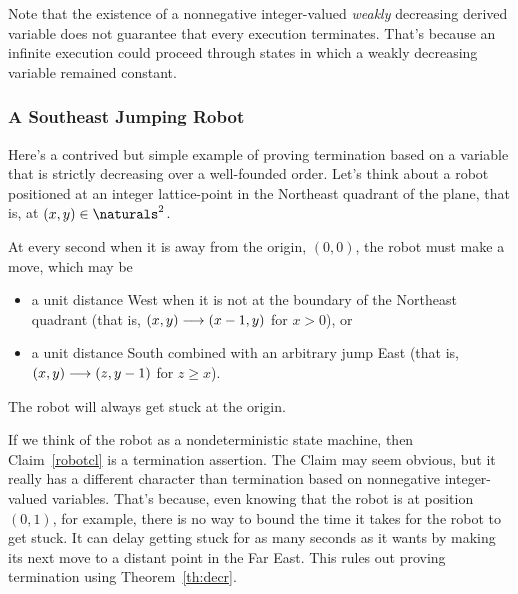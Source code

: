Note that the existence of a nonnegative integer-valued \emph{weakly}
decreasing derived variable does not guarantee that every execution
terminates.  That's because an infinite execution could proceed through
states in which a weakly decreasing variable remained constant.

\subsubsection{A Southeast Jumping Robot}

Here's a contrived but simple example of proving termination based on a
variable that is strictly decreasing over a well-founded order.  Let's
think about a robot positioned at an integer lattice-point in the
Northeast quadrant of the plane, that is, at $(x,y) \in \naturals^2$.

At every second when it is away from the origin, $(0,0)$, the robot must
make a move, which may be
\begin{itemize}

\item a unit distance West when it is not at the boundary of the Northeast
  quadrant (that is, $(x,y) \mathrel{\longrightarrow} (x-1,y)$ for $x>0$), or

\item a unit distance South combined with an arbitrary jump East (that is,
     $(x,y) \mathrel{\longrightarrow} (z,y-1)$ for $z\geq x$).

\end{itemize}
\begin{claim}\label{robotcl}
The robot will always get stuck at the origin.
\end{claim}

If we think of the robot as a nondeterministic state machine, then
Claim~\ref{robotcl} is a termination assertion.  The Claim may seem
obvious, but it really has a different character than termination based on
nonnegative integer-valued variables.  That's because, even knowing that
the robot is at position $(0,1)$, for example, there is no way to bound
the time it takes for the robot to get stuck.  It can delay getting stuck
for as many seconds as it wants by making its next move to a distant point
in the Far East.  This rules out proving termination using
Theorem~\ref{th:decr}.

